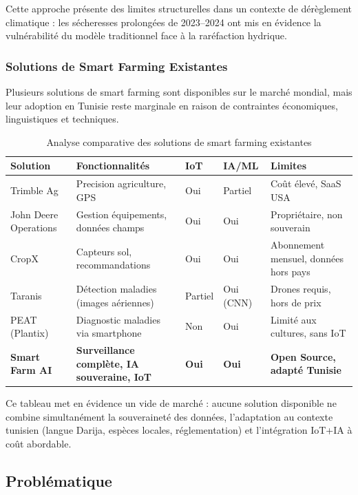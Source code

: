 \documentclass[12pt, a4paper]{report}
\begin{document}
Cette approche présente des limites structurelles dans un contexte de dérèglement climatique : les sécheresses prolongées de 2023--2024 ont mis en évidence la vulnérabilité du modèle traditionnel face à la raréfaction hydrique.

\subsubsection{Solutions de Smart Farming Existantes}

Plusieurs solutions de smart farming sont disponibles sur le marché mondial, mais leur adoption en Tunisie reste marginale en raison de contraintes économiques, linguistiques et techniques.

\begin{table}[H]
\centering
\caption{Analyse comparative des solutions de smart farming existantes}
\label{tab:existant}
\begin{tabularx}{\textwidth}{l X X X X}
\toprule
\textbf{Solution} & \textbf{Fonctionnalités} & \textbf{IoT} & \textbf{IA/ML} & \textbf{Limites} \\
\midrule
Trimble Ag & Precision agriculture, GPS & Oui & Partiel & Coût élevé, SaaS USA \\
\midrule
John Deere Operations & Gestion équipements, données champs & Oui & Oui & Propriétaire, non souverain \\
\midrule
CropX & Capteurs sol, recommandations & Oui & Oui & Abonnement mensuel, données hors pays \\
\midrule
Taranis & Détection maladies (images aériennes) & Partiel & Oui (CNN) & Drones requis, hors de prix \\
\midrule
PEAT (Plantix) & Diagnostic maladies via smartphone & Non & Oui & Limité aux cultures, sans IoT \\
\midrule
\textbf{Smart Farm AI} & \textbf{Surveillance complète, IA souveraine, IoT} & \textbf{Oui} & \textbf{Oui} & \textbf{Open Source, adapté Tunisie} \\
\bottomrule
\end{tabularx}
\end{table}

Ce tableau met en évidence un vide de marché : aucune solution disponible ne combine simultanément la souveraineté des données, l'adaptation au contexte tunisien (langue Darija, espèces locales, réglementation) et l'intégration IoT+IA à coût abordable.

\subsection{Problématique}
\end{document}
